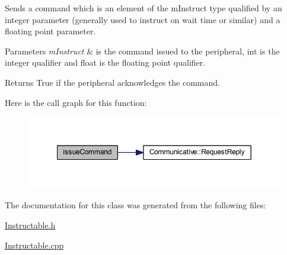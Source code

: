 Sends a command which is an element of the m\+Instruct type qualified by an integer parameter (generally used to instruct on wait time or similar) and a floating point parameter. 
\begin{DoxyParams}{Parameters}
{\em m\+Instruct} & is the command issued to the peripheral, int is the integer qualifier and float is the floating point qualifier. \\
\hline
\end{DoxyParams}
\begin{DoxyReturn}{Returns}
True if the peripheral acknowledges the command. 
\end{DoxyReturn}
Here is the call graph for this function\+:
\nopagebreak
\begin{figure}[H]
\begin{center}
\leavevmode
\includegraphics[width=349pt]{class_instructable_ac2d69c105880162fed7b7be07228cfa7_cgraph}
\end{center}
\end{figure}


The documentation for this class was generated from the following files\+:\begin{DoxyCompactItemize}
\item 
\mbox{\hyperlink{_instructable_8h}{Instructable.\+h}}\item 
\mbox{\hyperlink{_instructable_8cpp}{Instructable.\+cpp}}\end{DoxyCompactItemize}
